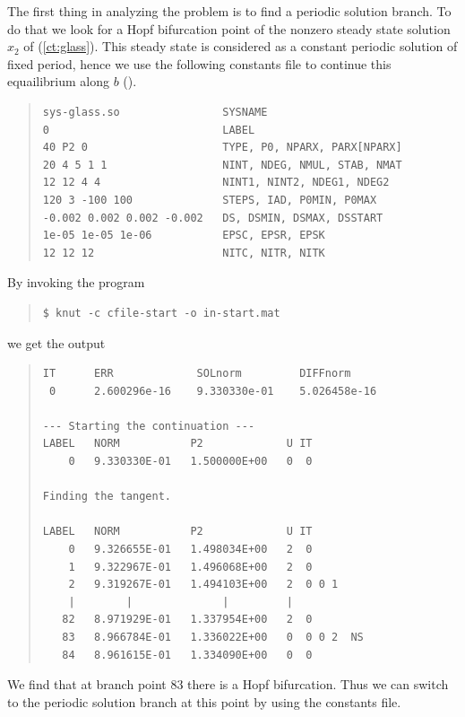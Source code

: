 \documentclass[10pt,a4paper]{ddedoc}
\begin{document}
The first thing in analyzing the problem is to find a periodic solution
branch. To do that we look for a Hopf bifurcation point of the nonzero steady state solution
$x_2$ of (\ref{ct:glass}). This steady state is considered as a constant periodic solution of
fixed period, hence we use the following constants file to continue this equailibrium along $b$ ().
{ \small \begin{quote} \begin{lstlisting}[basicstyle=\tt,frame=single]
sys-glass.so                SYSNAME
0                           LABEL
40 P2 0                     TYPE, P0, NPARX, PARX[NPARX]
20 4 5 1 1                  NINT, NDEG, NMUL, STAB, NMAT
12 12 4 4                   NINT1, NINT2, NDEG1, NDEG2
120 3 -100 100              STEPS, IAD, P0MIN, P0MAX
-0.002 0.002 0.002 -0.002   DS, DSMIN, DSMAX, DSSTART
1e-05 1e-05 1e-06           EPSC, EPSR, EPSK
12 12 12                    NITC, NITR, NITK
\end{lstlisting} \end{quote} } \noindent
By invoking the program
{ \small \begin{quote} \begin{lstlisting}[basicstyle=\tt,frame=single]
$ knut -c cfile-start -o in-start.mat
\end{lstlisting} \end{quote} } \noindent
we get the output
{ \small \begin{quote} \begin{lstlisting}[basicstyle=\tt,frame=single]
IT      ERR             SOLnorm         DIFFnorm
 0      2.600296e-16    9.330330e-01    5.026458e-16

--- Starting the continuation ---
LABEL   NORM           P2             U IT
    0   9.330330E-01   1.500000E+00   0  0

Finding the tangent.

LABEL   NORM           P2             U IT
    0   9.326655E-01   1.498034E+00   2  0
    1   9.322967E-01   1.496068E+00   2  0
    2   9.319267E-01   1.494103E+00   2  0 0 1
    |        |              |         |
   82   8.971929E-01   1.337954E+00   2  0
   83   8.966784E-01   1.336022E+00   0  0 0 2  NS
   84   8.961615E-01   1.334090E+00   0  0
\end{lstlisting} \end{quote} } \noindent
We find that at branch point 83 there is a Hopf bifurcation. Thus we can switch to the periodic solution branch at this point
by using the constants file.
\end{document}
